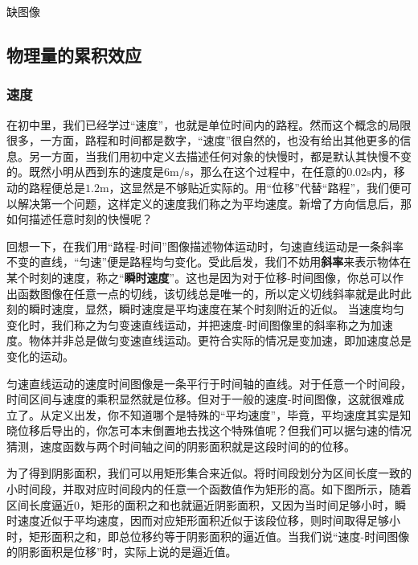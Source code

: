 
\begin{issues}
\issueTODO 缺图像
\end{issues}

\subsection{物理量的累积效应}

\subsubsection{速度}
在初中里，我们已经学过“速度”，也就是单位时间内的路程。然而这个概念的局限很多，一方面，路程和时间都是数字，“速度”很自然的，也没有给出其他更多的信息。另一方面，当我们用初中定义去描述任何对象的快慢时，都是默认其快慢不变的。既然小明从西到东的速度是$6 \mathrm{m/s}$，那么在这个过程中，在任意的$0.02\mathrm s$内，移动的路程便总是$1.2\mathrm m$，这显然是不够贴近实际的。用“位移”代替“路程”，我们便可以解决第一个问题，这样定义的速度我们称之为平均速度。新增了方向信息后，那如何描述任意时刻的快慢呢？

回想一下，在我们用“路程-时间”图像描述物体运动时，匀速直线运动是一条斜率不变的直线，“匀速”便是路程均匀变化。受此启发，我们不妨用\textbf{斜率}来表示物体在某个时刻的速度，称之“\textbf{瞬时速度}”。这也是因为对于位移-时间图像，你总可以作出函数图像在任意一点的切线，该切线总是唯一的，所以定义切线斜率就是此时此刻的瞬时速度，显然，瞬时速度是平均速度在某个时刻附近的近似。
当速度均匀变化时，我们称之为匀变速直线运动，并把速度-时间图像里的斜率称之为加速度。物体并非总是做匀变速直线运动。更符合实际的情况是变加速，即加速度总是变化的运动。

匀速直线运动的速度时间图像是一条平行于时间轴的直线。对于任意一个时间段，时间区间与速度的乘积显然就是位移。但对于一般的速度-时间图像，这就很难成立了。从定义出发，你不知道哪个是特殊的“平均速度”，毕竟，平均速度其实是知晓位移后导出的，你怎可本末倒置地去找这个特殊值呢？但我们可以据匀速的情况猜测，速度函数与两个时间轴之间的阴影面积就是这段时间的的位移。

为了得到阴影面积，我们可以用矩形集合来近似。将时间段划分为区间长度一致的小时间段，并取对应时间段内的任意一个函数值作为矩形的高。如下图所示，随着区间长度逼近0，矩形的面积之和也就逼近阴影面积，又因为当时间足够小时，瞬时速度近似于平均速度，因而对应矩形面积近似于该段位移，则时间取得足够小时，矩形面积之和，即总位移约等于阴影面积的逼近值。当我们说“速度-时间图像的阴影面积是位移”时，实际上说的是逼近值。


